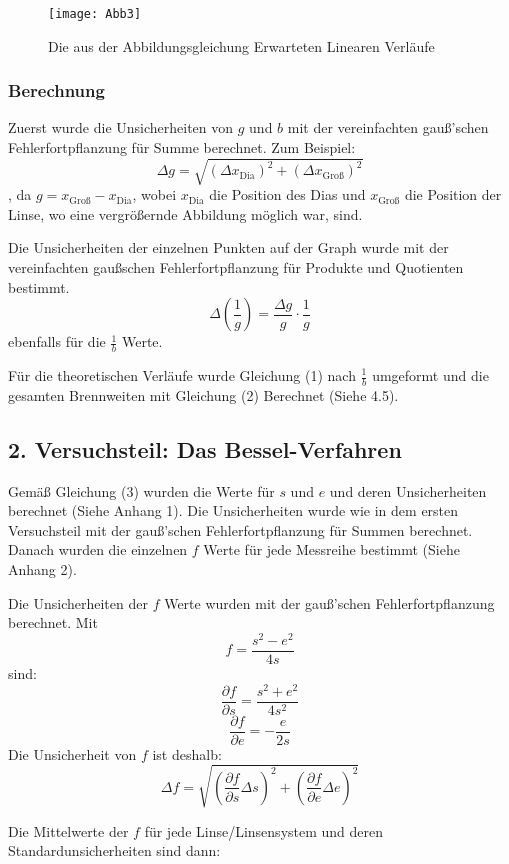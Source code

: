 \documentclass[11pt,a4paper]{article}
\begin{document}
\begin{figure}
	\centering
	\texttt{[image: Abb3]}
	\caption{ Die aus der Abbildungsgleichung Erwarteten Linearen Verläufe}
\end{figure} 

\begin{tcolorbox}[colback=white]
\subsubsection{Berechnung}
Zuerst wurde die Unsicherheiten von $g$ und $b$ mit der vereinfachten gauß'schen Fehlerfortpflanzung für Summe berechnet. Zum Beispiel:
$$ \Delta g = \sqrt{(\Delta x_\textrm{Dia})^2 + (\Delta x_\textrm{Groß})^2}$$
, da $g = x_\textrm{Groß} - x_\textrm{Dia}$, wobei $x_\textrm{Dia}$ die Position des Dias und $x_\textrm{Groß}$ die Position der Linse, wo eine vergrößernde Abbildung möglich war, sind. 

Die Unsicherheiten der einzelnen Punkten auf der Graph wurde mit der vereinfachten gaußschen Fehlerfortpflanzung für Produkte und Quotienten bestimmt.
$$ \Delta\left(\frac{1}{g}\right) = \frac{\Delta g}{g} \cdot \frac{1}{g}$$
ebenfalls für die $\frac{1}{b}$ Werte. 
	
Für die theoretischen Verläufe wurde Gleichung (1) nach $\frac{1}{b}$ umgeformt und die gesamten Brennweiten mit Gleichung (2) Berechnet (Siehe 4.5). 
	
	
\end{tcolorbox}

\subsection{2. Versuchsteil: Das Bessel-Verfahren}
Gemäß Gleichung (3) wurden die Werte für $s$ und $e$ und deren Unsicherheiten berechnet (Siehe Anhang 1). Die Unsicherheiten wurde wie in dem ersten Versuchsteil mit der gauß'schen Fehlerfortpflanzung für Summen berechnet. Danach wurden die einzelnen $f$ Werte für jede Messreihe bestimmt (Siehe Anhang 2). 

Die Unsicherheiten der $f$ Werte wurden mit der gauß'schen Fehlerfortpflanzung berechnet. Mit 
$$ f = \frac{s^2-e^2}{4s}$$
sind:
$$ \frac{\partial f}{\partial{s}} = \frac{s^2+e^2}{4s^2}$$
$$\frac{\partial f}{\partial{e}} = -\frac{e}{2s}$$
Die Unsicherheit von $f$ ist deshalb:
$$\Delta f = \sqrt{(\frac{\partial f}{\partial{s}}\Delta s)^2 + (\frac{\partial f}{\partial{e}} \Delta e)^2}$$

Die Mittelwerte der $f$ für jede Linse/Linsensystem und deren Standardunsicherheiten sind dann:
\end{document}
